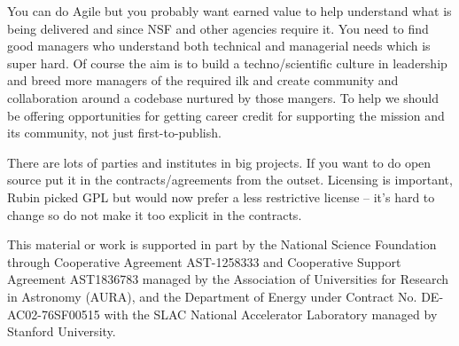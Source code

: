 \documentclass[11pt,twoside]{article}
\begin{document}
You can do Agile but you probably want earned value \citep{2014SPIE.9150E..1EG,2016SPIE.9911E..0NK} to help understand what is being delivered and since NSF and other agencies require it.
You need to find good managers who understand both technical and managerial needs which is  super hard.
Of course the aim is to build a techno/scientific  culture in leadership and breed more managers of the required ilk and
create community and collaboration around a codebase nurtured by those mangers.
To help
we should be offering opportunities for getting career credit for supporting the mission and its community, not just first-to-publish.

There are lots of parties and institutes in big projects.
If you want to do open source put it in the contracts/agreements from the outset.
Licensing is important, Rubin picked GPL but would now prefer a less restrictive license -- it's hard to change
so do not make it too explicit in the contracts.

\acknowledgments This material or work is supported in part by the National Science Foundation through Cooperative Agreement AST-1258333 and Cooperative Support Agreement AST1836783 managed by the Association of Universities for Research in Astronomy (AURA), and the Department of Energy under Contract No. DE-AC02-76SF00515 with the SLAC National Accelerator Laboratory managed by Stanford University.


\end{document}
